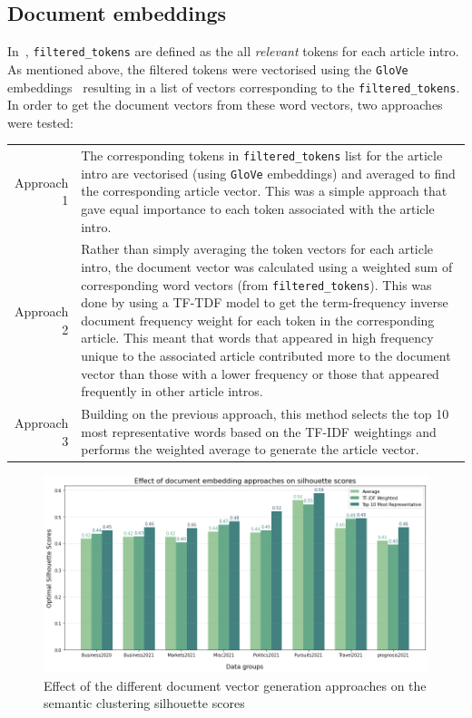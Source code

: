 \subsection{Document embeddings}

In~, \texttt{filtered\_tokens} are defined as the all \textit{relevant} tokens for each article intro. As mentioned above, the filtered tokens were vectorised using the \texttt{GloVe} embeddings~\cite{glove} resulting in a list of vectors corresponding to the \texttt{filtered\_tokens}. In order to get the document vectors from these word vectors, two approaches were tested: 

\renewcommand\arraystretch{2}
\captionsetup{singlelinecheck=false, labelfont=sc, labelsep=quad}
\begin{longtable}{@{\,}r <{\hskip 2pt} !{\foo} >{\arraybackslash}p{13cm}}
\centering

Approach 1 & The corresponding tokens in \texttt{filtered\_tokens} list for the article intro are vectorised (using \texttt{GloVe} embeddings) and averaged to find the corresponding article vector. This was a simple approach that gave equal importance to each token associated with the article intro. \\

Approach 2 & Rather than simply averaging the token vectors for each article intro, the document vector was calculated using a weighted sum of corresponding word vectors (from \texttt{filtered\_tokens}). This was done by using a TF-TDF model to get the term-frequency inverse document frequency weight for each token in the corresponding article. This meant that words that appeared in high frequency unique to the associated article contributed more to the document vector than those with a lower frequency or those that appeared frequently in other article intros. \\

Approach 3 & Building on the previous approach, this method selects the top 10 most representative words based on the TF-IDF weightings and performs the weighted average to generate the article vector.\\
\end{longtable}

\begin{figure}[H]
  \centering
  \includegraphics[width=0.8\linewidth]{images/eval/doc_embedding_sil.png}
  \caption{Effect of the different document vector generation approaches on the semantic clustering silhouette scores}
  \label{fig:doc_embeddings}
  \end{figure}

